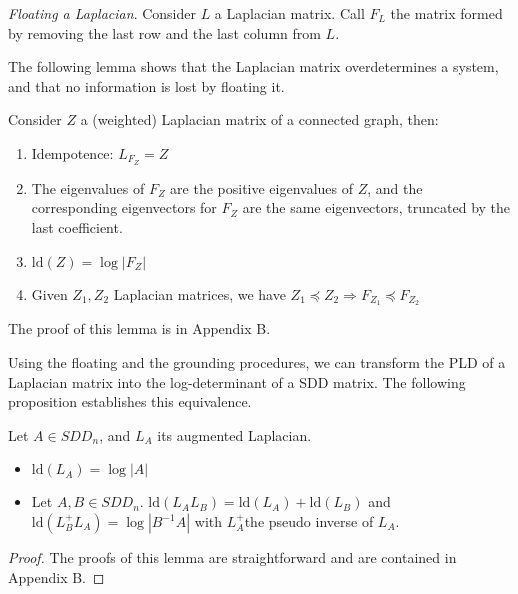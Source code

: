 \begin{definition}\emph{Floating a Laplacian}. Consider $L$ a Laplacian
matrix. Call $F_{L}$ the matrix formed by removing the last row and
the last column from $L$.

\end{definition}

The following lemma shows that the Laplacian matrix overdetermines
a system, and that no information is lost by floating it.

\begin{lemma}\label{lem:floating-properties}Consider $Z$ a (weighted)
Laplacian matrix of a connected graph, then: 
\begin{enumerate}
\item Idempotence: $L_{F_{Z}}=Z$ 
\item The eigenvalues of $F_{Z}$ are the positive eigenvalues of $Z$,
and the corresponding eigenvectors for $F_{Z}$ are the same eigenvectors,
truncated by the last coefficient. 
\item $\text{ld}\left(Z\right)=\log\left|F_{Z}\right|$ 
\item Given $Z_{1},Z_{2}$ Laplacian matrices, we have $Z_{1}\preceq Z_{2}\Rightarrow F_{Z_{1}}\preceq F_{Z_{2}}$ 
\end{enumerate}
\end{lemma}

The proof of this lemma is in Appendix B.

Using the floating and the grounding procedures, we can transform
the PLD of a Laplacian matrix into the log-determinant of a SDD matrix.
The following proposition establishes this equivalence.

\begin{lemma} \label{pro:pld-properties}Let $A\in SDD_{n}$, and
$L_{A}$ its augmented Laplacian. 
\begin{itemize}
\item $\text{ld}\left(L_{A}\right)=\log\left|A\right|$ 
\item Let $A,B\in SDD_{n}$. $\text{ld}\left(L_{A}L_{B}\right)=\text{ld}\left(L_{A}\right)+\text{ld}\left(L_{B}\right)$
and $\text{ld}\left(L_{B}^{+}L_{A}\right)=\log\left|B^{-1}A\right|$
with $L_{A}^{+}$the pseudo inverse of $L_{A}$. 
\end{itemize}
\end{lemma}

\begin{proof}The proofs of this lemma are straightforward and are
contained in Appendix B. \end{proof}

